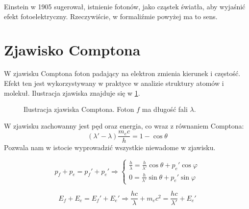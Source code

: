 \documentclass{../notatki}
\begin{document}
Einstein w 1905 sugerował, istnienie fotonów, jako cząstek światła,
aby wyjaśnić efekt fotoelektryczny. Rzeczywiście, w formaliźmie
powyżej ma to sens.

\section{Zjawisko Comptona}

W zjawisku Comptona foton padający na elektron zmienia kierunek i
częstość. Efekt ten jest wykorzystywany w praktyce w analizie struktury
atomów i molekuł. Ilustracja zjawiska znajduje się w \cref{fig:compton}.
\begin{figure}[H]
  \centering
  \caption{Ilustracja zjawiska Comptona. Foton $f$ ma długość fali $\lambda$.}
  \label{fig:compton}
\end{figure}

W zjawisku zachowanny jest pęd oraz energia, co wraz z równaniem Comptona:
$$
(\lambda' - \lambda) \frac{m_ec}{h} = 1 - \cos\theta
$$
Pozwala nam w istocie wyprowadzić wszystkie niewadome w zjawisku.

$$
p_f + p_e = p_f' + p_e' \Rightarrow
\begin{cases}
  \frac{h}{\lambda} = \frac{h}{\lambda'}\cos\theta + p_e'\cos\varphi \\
  0 = \frac{h}{\lambda'}\sin\theta + p_e'\sin\varphi
\end{cases}
$$

$$
E_f + E_e = E_f' + E_e' \Rightarrow \frac{hc}{\lambda} + m_ec^2 =
\frac{hc}{\lambda'} + E_e'
$$
\end{document}

